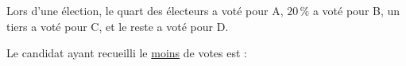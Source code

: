 
Lors d'une élection, le quart des électeurs a voté pour A, $20\,\%$ a voté pour B, un tiers a voté pour C, et le reste a voté pour D.

Le candidat ayant recueilli le \underline{moins} de votes est :

\smallskip

